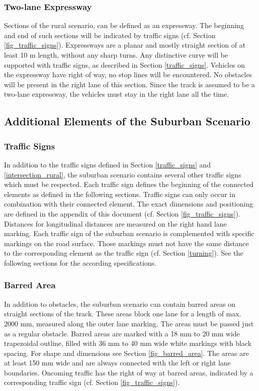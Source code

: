 \subsubsection{Two-lane Expressway}

Sections of the rural scenario, can be defined as an expressway. The beginning
and end of such sections will be indicated by traffic signs (cf. Section
\ref{fig_traffic_signs}). Expressways are a planar and mostly straight section
of at least 10 m length, without any sharp turns. Any distinctive curve will be
supported with traffic signs, as described in Section \ref{traffic_signs}.
Vehicles on the expressway have right of way, no stop lines will be
encountered. No obstacles will be present in the right lane of this section.
Since the track is assumed to be a two-lane expressway, the vehicles must stay
in the right lane all the time.

\subsection{Additional Elements of the Suburban Scenario}
\label{elements_suburban_scenario}
\subsubsection{Traffic Signs}

In addition to the traffic signs defined in Section \ref{traffic_signs} and
\ref{intersection_rural}, the suburban scenario contains several other traffic
signs which must be respected. Each traffic sign defines the beginning of the
connected elements as defined in the following sections. Traffic signs can only
occur in combination with their connected element. The exact dimensions and
positioning are defined in the appendix of this document (cf. Section
\ref{fig_traffic_signs}). Distances for longitudinal distances are measured on
the right hand lane marking. Each traffic sign of the suburban scenario is
complemented with specific markings on the road surface. Those markings must
not have the same distance to the corresponding element as the traffic sign
(cf. Section \ref{turning}). See the following sections for the according
specifications.

\subsubsection{Barred Area}

In addition to obstacles, the suburban scenario can contain barred areas on
straight sections of the track. These areas block one lane for a length of max.
2000 mm, measured along the outer lane marking. The areas must be passed just
as a regular obstacle. Barred areas are marked with a 18 mm to 20 mm wide
trapezoidal outline, filled with 36 mm to 40 mm wide white markings with black
spacing. For shape and dimensions see Section \ref{fig_barred_area}. The areas
are at least 150 mm wide and are always connected with the left or right lane
boundaries. Oncoming traffic has the right of way at barred areas, indicated by
a corresponding traffic sign (cf. Section \ref{fig_traffic_signs}).

